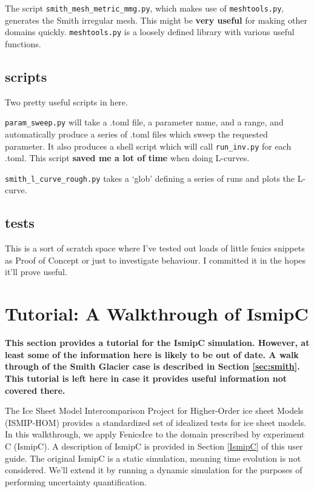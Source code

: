 \documentclass[11pt, reqno, nocenter]{article}
\begin{document}
The script {\tt smith\_mesh\_metric\_mmg.py}, which makes use of {\tt meshtools.py}, generates the Smith irregular mesh. This might be \textbf{very useful} for making other domains quickly. {\tt meshtools.py} is a loosely defined library with various useful functions.

\subsection{scripts}

Two pretty useful scripts in here.

{\tt param\_sweep.py} will take a .toml file, a parameter name, and a range, and automatically produce a series of .toml files which sweep the requested parameter. It also produces a shell script which will call {\tt run\_inv.py} for each .toml. This script \textbf{saved me a lot of time} when doing L-curves.

{\tt smith\_l\_curve\_rough.py} takes a `glob' defining a series of runs and plots the L-curve.

\subsection{tests}

This is a sort of scratch space where I've tested out loads of little fenics snippets as Proof of Concept or just to investigate behaviour. I committed it in the hopes it'll prove useful.

\section{Tutorial: A Walkthrough of IsmipC}

\textbf{This section provides a tutorial for the IsmipC simulation. However, at least some of the information here is likely to be out of date. A walk through of the Smith Glacier case is described in Section \ref{sec:smith}. This tutorial is left here in case it provides useful information not covered there.}

The Ice Sheet Model Intercomparison Project for Higher-Order ice sheet Models (ISMIP-HOM) provides a standardized set of idealized tests for ice sheet models. In this walkthrough, we apply FenicsIce to the domain prescribed by experiment C (IsmipC). A description of IsmipC is provided in Section \ref{IsmipC} of this user guide. The original IsmipC is a static simulation, meaning time evolution is not considered. We'll extend it by running a dynamic simulation for the purposes of performing uncertainty quantification.
\end{document}

